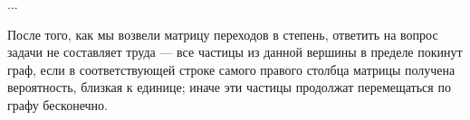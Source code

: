 	...
	
	После того, как мы возвели матрицу переходов в степень, ответить на вопрос задачи не составляет труда --- все частицы из данной вершины в пределе покинут граф, если в соответствующей строке самого правого столбца матрицы получена вероятность, близкая к единице; иначе эти частицы продолжат перемещаться по графу бесконечно. 
	
	\newpage %
	
	\printbibliography[
	heading=bibintoc%
	,title=Библиография %
	]
	

